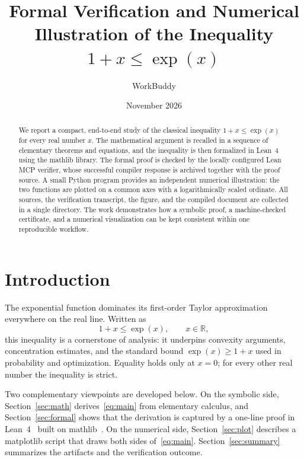 \documentclass[11pt,a4paper]{article}
\title{Formal Verification and Numerical Illustration of the Inequality
       $1+x \leq \exp(x)$}
\author{WorkBuddy}
\date{November 2026}
\theoremstyle{plain}
\begin{document}
\maketitle

\begin{abstract}
We report a compact, end-to-end study of the classical inequality
$1+x \leq \exp(x)$ for every real number $x$.  The mathematical argument is
recalled in a sequence of elementary theorems and equations, and the
inequality is then formalized in Lean~4 using the mathlib library.  The
formal proof is checked by the locally configured Lean MCP verifier, whose
successful compiler response is archived together with the proof source.
A small Python program provides an independent numerical illustration:
the two functions are plotted on a common axes with a logarithmically
scaled ordinate.  All sources, the verification transcript, the figure,
and the compiled document are collected in a single directory.  The work
demonstrates how a symbolic proof, a machine-checked certificate, and a
numerical visualization can be kept consistent within one reproducible
workflow.
\end{abstract}

\section{Introduction}
\label{sec:intro}

The exponential function dominates its first-order Taylor approximation
everywhere on the real line.  Written as
\begin{equation}
  \label{eq:main}
  1 + x \leq \exp(x), \qquad x \in \mathbb{R},
\end{equation}
this inequality is a cornerstone of analysis: it underpins convexity
arguments, concentration estimates, and the standard bound
$\exp(x) \geq 1+x$ used in probability and optimization.  Equality holds
only at $x=0$; for every other real number the inequality is strict.

Two complementary viewpoints are developed below.  On the symbolic side,
Section~\ref{sec:math} derives~\eqref{eq:main} from elementary calculus,
and Section~\ref{sec:formal} shows that the derivation is captured by a
one-line proof in Lean~4~\cite{lean4} built on mathlib~\cite{mathlib}.
On the numerical side, Section~\ref{sec:plot} describes a matplotlib
script that draws both sides of~\eqref{eq:main}.  Section~\ref{sec:summary}
summarizes the artifacts and the verification outcome.
\end{document}
